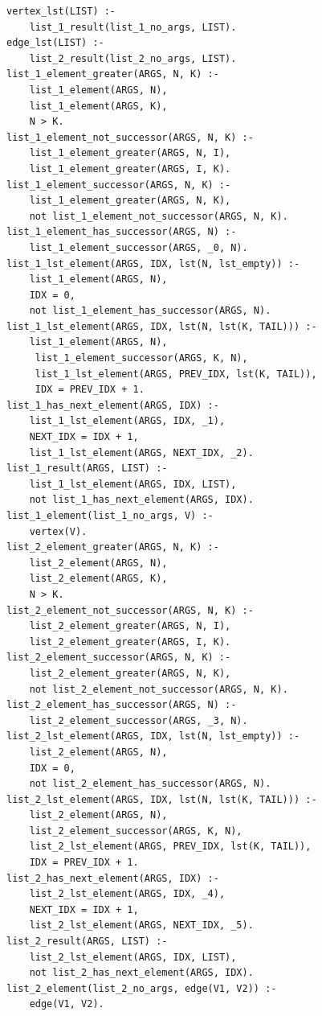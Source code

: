 \begin{lstlisting}[style=asp-code, label={lst:graph-list-aggregation-rewritten}, caption={Rewritten list aggregates from Listing~\ref{lst:graph-list-aggregation-lstagg}}]  
vertex_lst(LIST) :- 
    list_1_result(list_1_no_args, LIST).
edge_lst(LIST) :- 
    list_2_result(list_2_no_args, LIST).
list_1_element_greater(ARGS, N, K) :- 
    list_1_element(ARGS, N), 
    list_1_element(ARGS, K), 
    N > K.
list_1_element_not_successor(ARGS, N, K) :- 
    list_1_element_greater(ARGS, N, I), 
    list_1_element_greater(ARGS, I, K).
list_1_element_successor(ARGS, N, K) :- 
    list_1_element_greater(ARGS, N, K), 
    not list_1_element_not_successor(ARGS, N, K).
list_1_element_has_successor(ARGS, N) :- 
    list_1_element_successor(ARGS, _0, N).
list_1_lst_element(ARGS, IDX, lst(N, lst_empty)) :- 
    list_1_element(ARGS, N), 
    IDX = 0,
    not list_1_element_has_successor(ARGS, N).
list_1_lst_element(ARGS, IDX, lst(N, lst(K, TAIL))) :- 
    list_1_element(ARGS, N),
     list_1_element_successor(ARGS, K, N), 
     list_1_lst_element(ARGS, PREV_IDX, lst(K, TAIL)), 
     IDX = PREV_IDX + 1.
list_1_has_next_element(ARGS, IDX) :- 
    list_1_lst_element(ARGS, IDX, _1), 
    NEXT_IDX = IDX + 1, 
    list_1_lst_element(ARGS, NEXT_IDX, _2).
list_1_result(ARGS, LIST) :- 
    list_1_lst_element(ARGS, IDX, LIST), 
    not list_1_has_next_element(ARGS, IDX).
list_1_element(list_1_no_args, V) :- 
    vertex(V).
list_2_element_greater(ARGS, N, K) :- 
    list_2_element(ARGS, N), 
    list_2_element(ARGS, K), 
    N > K.
list_2_element_not_successor(ARGS, N, K) :- 
    list_2_element_greater(ARGS, N, I), 
    list_2_element_greater(ARGS, I, K).
list_2_element_successor(ARGS, N, K) :- 
    list_2_element_greater(ARGS, N, K), 
    not list_2_element_not_successor(ARGS, N, K).
list_2_element_has_successor(ARGS, N) :- 
    list_2_element_successor(ARGS, _3, N).
list_2_lst_element(ARGS, IDX, lst(N, lst_empty)) :- 
    list_2_element(ARGS, N), 
    IDX = 0, 
    not list_2_element_has_successor(ARGS, N).
list_2_lst_element(ARGS, IDX, lst(N, lst(K, TAIL))) :- 
    list_2_element(ARGS, N), 
    list_2_element_successor(ARGS, K, N), 
    list_2_lst_element(ARGS, PREV_IDX, lst(K, TAIL)), 
    IDX = PREV_IDX + 1.
list_2_has_next_element(ARGS, IDX) :- 
    list_2_lst_element(ARGS, IDX, _4), 
    NEXT_IDX = IDX + 1, 
    list_2_lst_element(ARGS, NEXT_IDX, _5).
list_2_result(ARGS, LIST) :- 
    list_2_lst_element(ARGS, IDX, LIST), 
    not list_2_has_next_element(ARGS, IDX).
list_2_element(list_2_no_args, edge(V1, V2)) :- 
    edge(V1, V2).   
\end{lstlisting}    

